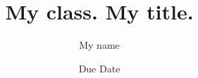 \documentclass[10pt]{article}
\newcommand{\Author}{My name}
\newcommand{\Class}{My class}
\newcommand{\Title}{My title}
\newcommand{\DDate}{Due Date}
\begin{document}
\title{\Class. \Title.}
\date{\DDate}
\author{\Author}
\maketitle

\section{}

\subsection{}
\end{document}
